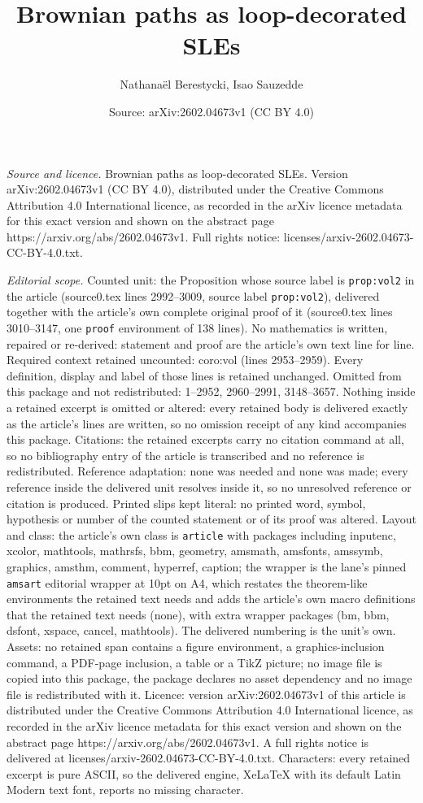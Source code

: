 \documentclass[10pt,a4paper]{amsart}
\title[Brownian paths as loop-decorated SLEs]{Brownian paths as loop-decorated SLEs}
\author{Nathana\"el Berestycki, Isao Sauzedde}
\date{Source: arXiv:2602.04673v1 (CC BY 4.0)}
\begin{document}
\maketitle

\noindent\emph{Source and licence.} Brownian paths as loop-decorated SLEs. Version arXiv:2602.04673v1 (CC BY 4.0), distributed under the Creative Commons Attribution 4.0 International licence, as recorded in the arXiv licence metadata for this exact version and shown on the abstract page https://arxiv.org/abs/2602.04673v1. Full rights notice: licenses/arxiv-2602.04673-CC-BY-4.0.txt.\par\smallskip

\noindent\textit{Editorial scope.} Counted unit: the Proposition whose source label is \texttt{prop:vol2} in the article (source0.tex lines 2992--3009, source label \texttt{prop:vol2}), delivered together with the article's own complete original proof of it (source0.tex lines 3010--3147, one \texttt{proof} environment of 138 lines). No mathematics is written, repaired or re-derived: statement and proof are the article's own text line for line. Required context retained uncounted: coro:vol (lines 2953--2959). Every definition, display and label of those lines is retained unchanged. Omitted from this package and not redistributed: 1--2952, 2960--2991, 3148--3657. Nothing inside a retained excerpt is omitted or altered: every retained body is delivered exactly as the article's lines are written, so no omission receipt of any kind accompanies this package. Citations: the retained excerpts carry no citation command at all, so no bibliography entry of the article is transcribed and no reference is redistributed. Reference adaptation: none was needed and none was made; every reference inside the delivered unit resolves inside it, so no unresolved reference or citation is produced. Printed slips kept literal: no printed word, symbol, hypothesis or number of the counted statement or of its proof was altered. Layout and class: the article's own class is \texttt{article} with packages including inputenc, xcolor, mathtools, mathrsfs, bbm, geometry, amsmath, amsfonts, amssymb, graphics, amsthm, comment, hyperref, caption; the wrapper is the lane's pinned \texttt{amsart} editorial wrapper at 10pt on A4, which restates the theorem-like environments the retained text needs and adds the article's own macro definitions that the retained text needs (none), with extra wrapper packages (bm, bbm, dsfont, xspace, cancel, mathtools). The delivered numbering is the unit's own. Assets: no retained span contains a figure environment, a graphics-inclusion command, a PDF-page inclusion, a table or a TikZ picture; no image file is copied into this package, the package declares no asset dependency and no image file is redistributed with it. Licence: version arXiv:2602.04673v1 of this article is distributed under the Creative Commons Attribution 4.0 International licence, as recorded in the arXiv licence metadata for this exact version and shown on the abstract page https://arxiv.org/abs/2602.04673v1. A full rights notice is delivered at licenses/arxiv-2602.04673-CC-BY-4.0.txt. Characters: every retained excerpt is pure ASCII, so the delivered engine, XeLaTeX with its default Latin Modern text font, reports no missing character.
\end{document}
